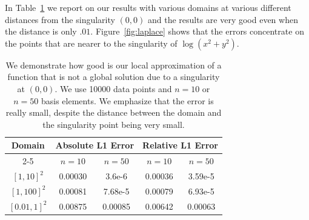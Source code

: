 \documentclass{article} %
\theoremstyle{plain}
\theoremstyle{definition}
\theoremstyle{remark}
\begin{document}
In Table~\ref{table:singularity} we report on our results with various domains at various different distances from the singularity $(0,0)$ and the results are very good even when the distance is only $.01$.
Figure~\ref{fig:laplace} shows that the errors concentrate on the points that are nearer to the singularity of $\log(x^2+y^2)$.
\begin{table}
\caption{\small We demonstrate how good is our local approximation of a function that is not a global solution due to a singularity at $(0,0)$. We use 10000 data points and \(n=10\) or \(n=50\) basis elements. We emphasize that the error is really small, despite the distance between the domain and the singularity point being very small.}\label{table:singularity}
\centering
\begin{tabular}{|c||c|c|c|c|}
\hline
\multirow{2}{*}{Domain} &\multicolumn{2}{c|}{Absolute L1 Error} &\multicolumn{2}{c|}{Relative L1 Error}\\
\cline{2-5}
&$n=10$ & $n=50$ & $n=10$ &$n=50$\\
\hline
\([1,10]^2\) &0.00030 &3.6e-6 &0.00036 &3.59e-5\\
\([1,100]^2\) &0.00081 &7.68e-5 &0.00079 &6.93e-5\\
\([0.01,1]^2\) &0.00875 &0.00085 & 0.00642 &0.00063\\
\hline
\end{tabular}

\end{table}
\end{document}
